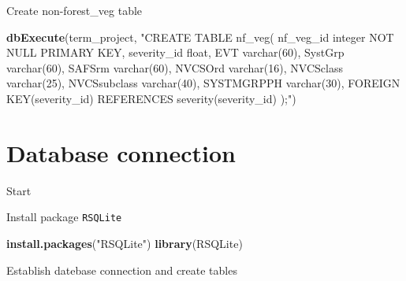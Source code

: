 \documentclass[]{book}
\newenvironment{Shaded}{\begin{snugshade}}{\end{snugshade}}
\newcommand{\KeywordTok}[1]{\textcolor[rgb]{0.13,0.29,0.53}{\textbf{#1}}}
\newcommand{\NormalTok}[1]{#1}
\newcommand{\StringTok}[1]{\textcolor[rgb]{0.31,0.60,0.02}{#1}}
\begin{document}
Create non-forest\_veg table

\begin{Shaded}
\begin{Highlighting}[]
\KeywordTok{dbExecute}\NormalTok{(term_project, }\StringTok{"CREATE TABLE nf_veg(}
\StringTok{nf_veg_id integer NOT NULL PRIMARY KEY,}
\StringTok{severity_id float,}
\StringTok{EVT varchar(60),}
\StringTok{SystGrp varchar(60),}
\StringTok{SAFSrm varchar(60),}
\StringTok{NVCSOrd varchar(16),}
\StringTok{NVCSclass varchar(25),}
\StringTok{NVCSsubclass varchar(40),}
\StringTok{SYSTMGRPPH varchar(30),}
\StringTok{FOREIGN KEY(severity_id) REFERENCES severity(severity_id)}
\StringTok{);"}\NormalTok{)}
\end{Highlighting}
\end{Shaded}

\hypertarget{SQL}{%
\chapter{Database connection}\label{SQL}}

Start

Install package \texttt{RSQLite}

\begin{Shaded}
\begin{Highlighting}[]
\KeywordTok{install.packages}\NormalTok{(}\StringTok{"RSQLite"}\NormalTok{)}
\KeywordTok{library}\NormalTok{(RSQLite)}
\end{Highlighting}
\end{Shaded}

Establish datebase connection and create tables
\end{document}
